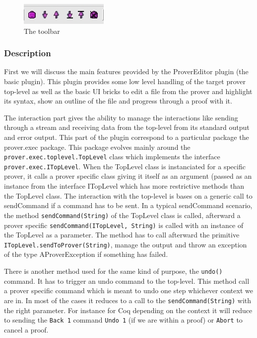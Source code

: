 \documentclass{entcs}
\begin{document}
\begin{figure}
\begin{center}
\includegraphics[width=0.3\linewidth]{toolbar}
\end{center}
  \caption{The toolbar}
  \label{tb}
\end{figure}

\subsubsection{Description}
\label{subsubsec:description}

First we will discuss the main features provided by the ProverEditor plugin
(the basic plugin). This plugin provides some low level handling of the target
prover top-level as well as the basic UI bricks to edit a file from the 
prover and highlight its syntax, show an outline of the file and
progress through a proof with it.

The interaction part gives the ability to manage the interactions like sending
through a stream and receiving data from the top-level from its standard output
and error output.
This part of the plugin correspond to a particular package the 
prover.exec package.
This package evolves mainly around the \\
{\tt prover.exec.toplevel.TopLevel} class
which implements the interface {\tt prover.exec.ITopLevel}. 
When the TopLevel class
is instanciated for a specific prover, it calls a prover specific class giving 
it itself as an argument (passed as an instance from the interface
ITopLevel which has more restrictive methods than the TopLevel class.
The interaction with the top-level is bases on a generic call to sendCommand
if a command has to be sent. In a typical sendCommand scenario, the method
{\tt sendCommand(String)} of the TopLevel class is called, 
afterward a prover specific 
{\tt sendCommand(ITopLevel, String)} is called with an instance of the 
TopLevel as a parameter. The method has to call afterward the primitive
{\tt ITopLevel.sendToProver(String)}, manage the output and throw an 
exception of the type AProverException if something has failed.

There is another method used for the same kind of purpose, the
{\tt undo()} command. It has to trigger an undo command to the
top-level. This method call a prover specific  command
which is meant to undo one step whichever context we are in. In most of
the cases it reduces to a call to the {\tt sendCommand(String)} with the 
right parameter.
For instance for Coq depending on the context it will  reduce to 
sending the {\tt Back 1} command {\tt Undo 1}
 (if we are within a proof) or {\tt Abort}
to cancel a proof.\\
\end{document}
